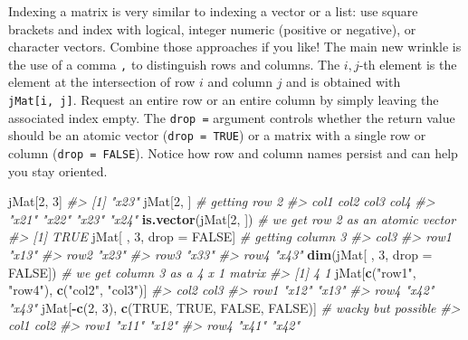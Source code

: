 \documentclass[
]{book}
\newenvironment{Shaded}{\begin{snugshade}}{\end{snugshade}}
\newcommand{\CommentTok}[1]{\textcolor[rgb]{0.56,0.35,0.01}{\textit{#1}}}
\newcommand{\DataTypeTok}[1]{\textcolor[rgb]{0.13,0.29,0.53}{#1}}
\newcommand{\DecValTok}[1]{\textcolor[rgb]{0.00,0.00,0.81}{#1}}
\newcommand{\KeywordTok}[1]{\textcolor[rgb]{0.13,0.29,0.53}{\textbf{#1}}}
\newcommand{\NormalTok}[1]{#1}
\newcommand{\OperatorTok}[1]{\textcolor[rgb]{0.81,0.36,0.00}{\textbf{#1}}}
\newcommand{\OtherTok}[1]{\textcolor[rgb]{0.56,0.35,0.01}{#1}}
\newcommand{\StringTok}[1]{\textcolor[rgb]{0.31,0.60,0.02}{#1}}
\begin{document}
Indexing a matrix is very similar to indexing a vector or a list: use square brackets and index with logical, integer numeric (positive or negative), or character vectors. Combine those approaches if you like! The main new wrinkle is the use of a comma \texttt{,} to distinguish rows and columns. The \(i,j\)-th element is the element at the intersection of row \(i\) and column \(j\) and is obtained with \texttt{jMat{[}i,\ j{]}}. Request an entire row or an entire column by simply leaving the associated index empty. The \texttt{drop\ =} argument controls whether the return value should be an atomic vector (\texttt{drop\ =\ TRUE}) or a matrix with a single row or column (\texttt{drop\ =\ FALSE}). Notice how row and column names persist and can help you stay oriented.

\begin{Shaded}
\begin{Highlighting}[]
\NormalTok{jMat[}\DecValTok{2}\NormalTok{, }\DecValTok{3}\NormalTok{]}
\CommentTok{#> [1] "x23"}
\NormalTok{jMat[}\DecValTok{2}\NormalTok{, ] }\CommentTok{# getting row 2}
\CommentTok{#>  col1  col2  col3  col4 }
\CommentTok{#> "x21" "x22" "x23" "x24"}
\KeywordTok{is.vector}\NormalTok{(jMat[}\DecValTok{2}\NormalTok{, ]) }\CommentTok{# we get row 2 as an atomic vector}
\CommentTok{#> [1] TRUE}
\NormalTok{jMat[ , }\DecValTok{3}\NormalTok{, drop =}\StringTok{ }\OtherTok{FALSE}\NormalTok{] }\CommentTok{# getting column 3}
\CommentTok{#>      col3 }
\CommentTok{#> row1 "x13"}
\CommentTok{#> row2 "x23"}
\CommentTok{#> row3 "x33"}
\CommentTok{#> row4 "x43"}
\KeywordTok{dim}\NormalTok{(jMat[ , }\DecValTok{3}\NormalTok{, }\DataTypeTok{drop =} \OtherTok{FALSE}\NormalTok{]) }\CommentTok{# we get column 3 as a 4 x 1 matrix}
\CommentTok{#> [1] 4 1}
\NormalTok{jMat[}\KeywordTok{c}\NormalTok{(}\StringTok{"row1"}\NormalTok{, }\StringTok{"row4"}\NormalTok{), }\KeywordTok{c}\NormalTok{(}\StringTok{"col2"}\NormalTok{, }\StringTok{"col3"}\NormalTok{)]}
\CommentTok{#>      col2  col3 }
\CommentTok{#> row1 "x12" "x13"}
\CommentTok{#> row4 "x42" "x43"}
\NormalTok{jMat[}\OperatorTok{-}\KeywordTok{c}\NormalTok{(}\DecValTok{2}\NormalTok{, }\DecValTok{3}\NormalTok{), }\KeywordTok{c}\NormalTok{(}\OtherTok{TRUE}\NormalTok{, }\OtherTok{TRUE}\NormalTok{, }\OtherTok{FALSE}\NormalTok{, }\OtherTok{FALSE}\NormalTok{)] }\CommentTok{# wacky but possible}
\CommentTok{#>      col1  col2 }
\CommentTok{#> row1 "x11" "x12"}
\CommentTok{#> row4 "x41" "x42"}
\end{Highlighting}
\end{Shaded}
\end{document}
